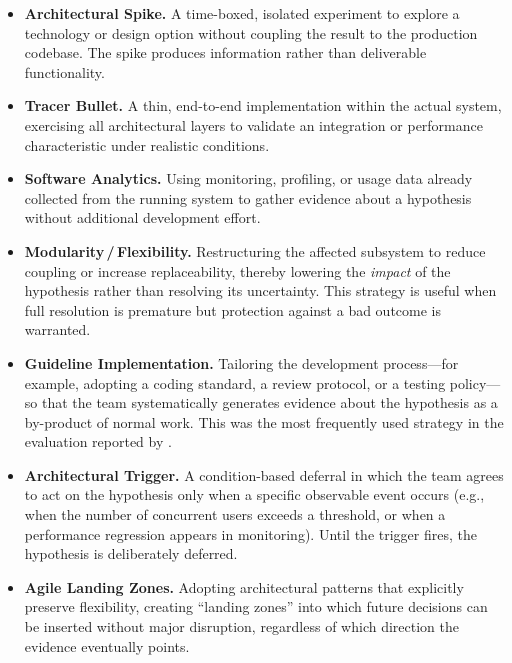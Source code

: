 \begin{itemize}
  \item \textbf{Architectural Spike.} A time-boxed, isolated experiment to explore a
  technology or design option without coupling the result to the production codebase.
  The spike produces information rather than deliverable functionality.

  \item \textbf{Tracer Bullet.} A thin, end-to-end implementation within the actual
  system, exercising all architectural layers to validate an integration or performance
  characteristic under realistic conditions.

  \item \textbf{Software Analytics.} Using monitoring, profiling, or usage data already
  collected from the running system to gather evidence about a hypothesis without
  additional development effort.

  \item \textbf{Modularity\,/\,Flexibility.} Restructuring the affected subsystem to
  reduce coupling or increase replaceability, thereby lowering the \emph{impact} of the
  hypothesis rather than resolving its uncertainty. This strategy is useful when full
  resolution is premature but protection against a bad outcome is warranted.

  \item \textbf{Guideline Implementation.} Tailoring the development process—for
  example, adopting a coding standard, a review protocol, or a testing policy—so that
  the team systematically generates evidence about the hypothesis as a by-product of
  normal work. This was the most frequently used strategy in the evaluation reported by \citet{silva2024tse}.

  \item \textbf{Architectural Trigger.} A condition-based deferral in which the team
  agrees to act on the hypothesis only when a specific observable event occurs (e.g.,
  when the number of concurrent users exceeds a threshold, or when a performance
  regression appears in monitoring). Until the trigger fires, the hypothesis is
  deliberately deferred.

  \item \textbf{Agile Landing Zones.} Adopting architectural patterns that explicitly
  preserve flexibility, creating ``landing zones'' into which future decisions can be
  inserted without major disruption, regardless of which direction the evidence
  eventually points.
\end{itemize}

